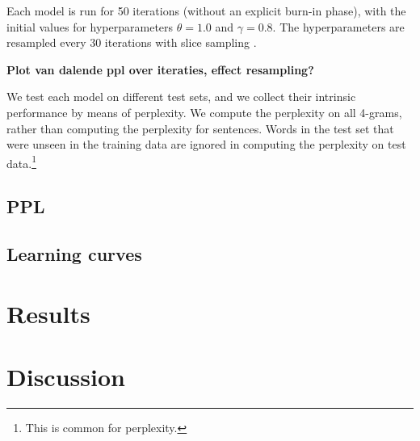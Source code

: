   Each model is run for 50 iterations (without an explicit burn-in phase), with the initial values for hyperparameters $\theta=1.0$ and $\gamma=0.8$. The hyperparameters are resampled every 30 iterations with slice sampling \cite{walker2007sampling}.
  
  \textbf{Plot van dalende ppl over iteraties, effect resampling?}
  
  We test each model on different test sets, and we collect their intrinsic performance by means of perplexity. We compute the perplexity on all 4-grams, rather than computing the perplexity for sentences. 
  Words in the test set that were unseen in the training data are ignored in computing the perplexity on test data.\footnote{This is common for perplexity. } 

\subsection{PPL}
\subsection{Learning curves}

\section{Results}

\section{Discussion}